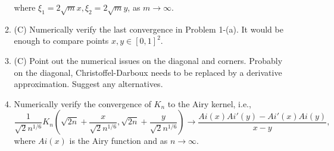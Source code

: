 \documentclass{article}
\begin{document}
\begin{enumerate}
\begin{enumerate}
\begin{equation*}
        \end{equation*}
        where $\xi_1 = 2\sqrt{m}x, \xi_2 = 2\sqrt{m}y$, as $m\to\infty$.
        \item (C) Numerically verify the last convergence in Problem 1-(a). It would be enough to compare points $x, y\in[0,1]^2$.
        \item (C) Point out the numerical issues on the diagonal and corners. Probably on the diagonal, Christoffel-Darboux needs to be replaced by a derivative approximation. Suggest any alternatives. 
        \item Numerically verify the convergence of $K_n$ to the Airy kernel, i.e., 
        \begin{equation*}
            \frac{1}{\sqrt{2}n^{1/6}}K_n(\sqrt{2n}+\frac{x}{\sqrt{2}n^{1/6}}, \sqrt{2n}+\frac{y}{\sqrt{2}n^{1/6}}) \to \frac{Ai(x)Ai'(y)-Ai'(x)Ai(y)}{x-y},
        \end{equation*}
        where $Ai(x)$ is the Airy function and as $n\to \infty$. 
    \end{enumerate}

\end{enumerate}
\end{document}
